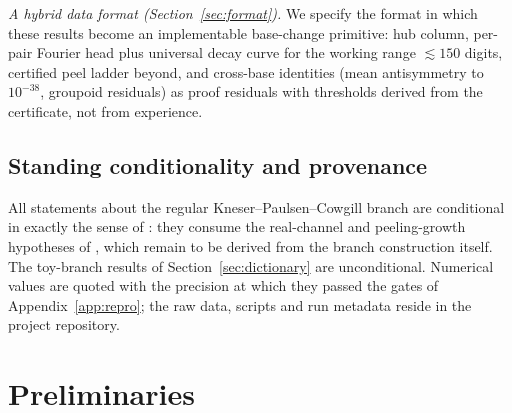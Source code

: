 \documentclass[11pt,a4paper]{article}
\theoremstyle{definition}
\theoremstyle{remark}
\begin{document}
\emph{A hybrid data format (Section~\ref{sec:format}).} We specify the format in which these
results become an implementable base-change primitive: hub column, per-pair Fourier head plus
universal decay curve for the working range $\lesssim 150$ digits, certified peel ladder
beyond, and cross-base identities (mean antisymmetry to $10^{-38}$, groupoid residuals) as
proof residuals with thresholds derived from the certificate, not from experience.

\subsection{Standing conditionality and provenance}

All statements about the regular Kneser--Paulsen--Cowgill branch are conditional in exactly
the sense of \cite[Rem.~7.4]{unified}: they consume the real-channel and peeling-growth
hypotheses of \cite[Hyp.~2.2, 2.4]{phaselaw}, which remain to be derived from the branch
construction itself. The toy-branch results of Section~\ref{sec:dictionary} are
unconditional. Numerical values are quoted with the precision at which they passed the gates
of Appendix~\ref{app:repro}; the raw data, scripts and run metadata reside in the project
repository.

\section{Preliminaries}\label{sec:prelim}
\end{document}
